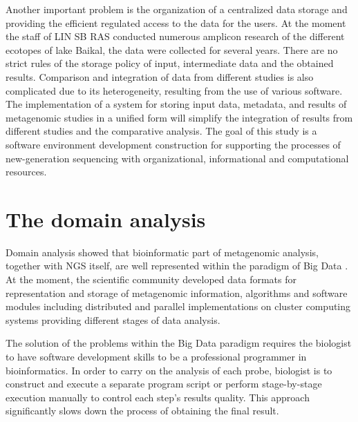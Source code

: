 \documentclass[conference,a4paper]{IEEEtran}
\begin{document}
Another important problem is the organization of a centralized data storage and providing the efficient regulated access to the data for the users.  At the moment the staff of LIN SB RAS conducted numerous amplicon research of the different ecotopes of lake Baikal, the data were collected for several years.  There are no strict rules of the storage policy of input, intermediate data and the obtained results.  Comparison and integration of data from different studies is also complicated due to its heterogeneity, resulting from the use of various software.  The implementation of a system for storing input data, metadata, and results of metagenomic studies in a unified form will simplify the integration of results from different studies and the comparative analysis.
 The goal of this study is a software environment development construction for supporting the processes of new-generation sequencing with organizational, informational and computational resources.

\section{The domain analysis}
\label{sec:doma}

Domain analysis showed that bioinformatic part of metagenomic analysis, together with NGS itself, are well represented within the paradigm of Big Data \cite{BD}.  At the moment, the scientific community developed data formats for representation and storage of metagenomic information, algorithms and software modules including distributed and parallel implementations on cluster computing systems providing different stages of data analysis.

The solution of the problems within the Big Data paradigm requires the biologist to have software development skills to be a professional programmer in bioinformatics.  In order to carry on the analysis of each probe, biologist is to construct and execute a separate program script or perform stage-by-stage execution manually to control each step's results quality.  This approach significantly slows down the process of obtaining the final result.
\end{document}
